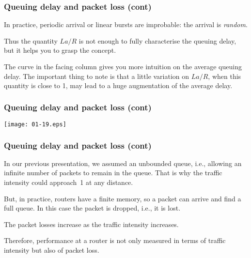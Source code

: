 %
\begin{frame}
\frametitle{Queuing delay and packet loss (cont)}

In practice, periodic arrival or linear bursts are improbable: the
arrival is \emph{random}. 

\bigskip

Thus the quantity \(La/R\) is not enough to fully characterise the
queuing delay, but it helps you to grasp the concept.

\bigskip

The curve in the facing column gives you more intuition on the average
queuing delay. The important thing to note is that a little variation
on \(La/R\), when this quantity is close to 1, may lead to a huge
augmentation of the average delay.

\end{frame}

%
\begin{frame}
\frametitle{Queuing delay and packet loss (cont)}

\begin{center}
  \texttt{[image: 01-19.eps]}
\end{center}

\end{frame}

%
\begin{frame}
\frametitle{Queuing delay and packet loss (cont)}

In our previous presentation, we assumed an unbounded queue,
i.e., allowing an infinite number of packets to remain in the
queue. That is why the traffic intensity could approach~1 at any
distance.

\bigskip

But, in practice, routers have a finite memory, so a packet can arrive
and find a full queue. In this case the packet is dropped, i.e., it is
lost.

\bigskip

The packet losses increase as the traffic intensity increases.

\bigskip

Therefore, performance at a router is not only measured in terms of
traffic intensity but also of packet loss.

\end{frame}

